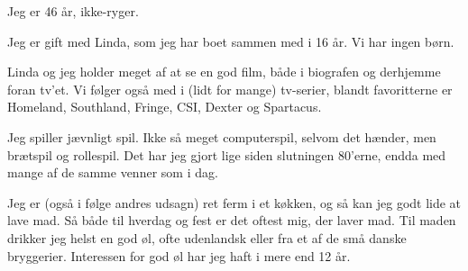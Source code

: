 \documentclass[a4paper,11pt]{article}
\begin{document}
Jeg er 46 år, ikke-ryger.

Jeg er gift med Linda, som jeg har boet sammen med i 16 år. Vi har
ingen børn.

Linda og jeg holder meget af at se en god film, både i biografen og
derhjemme foran tv’et. Vi følger også med i (lidt for mange)
tv-serier, blandt favoritterne er Homeland, Southland, Fringe, CSI,
Dexter og Spartacus.

Jeg spiller jævnligt spil. Ikke så meget computerspil, selvom det
hænder, men brætspil og rollespil. Det har jeg gjort lige siden
slutningen 80’erne, endda med mange af de samme venner som i dag.

Jeg er (også i følge andres udsagn) ret ferm i et køkken, og så kan
jeg godt lide at lave mad. Så både til hverdag og fest er det oftest
mig, der laver mad. Til maden drikker jeg helst en god øl, ofte
udenlandsk eller fra et af de små danske bryggerier. Interessen for
god øl har jeg haft i mere end 12 år.
\end{document}
